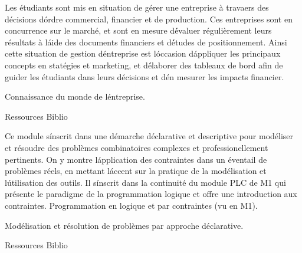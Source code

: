 \vfill

{
Les étudiants sont mis en situation de gérer une entreprise à travaers des décisions d\'ordre commercial, financier et de production. Ces entreprises sont en concurrence sur le marché, et sont en mesure d\'évaluer régulièrement leurs résultats à l\'aide des documents financiers et d\'études de positionnement. Ainsi cette situation de gestion d\'entreprise est l\'occasion d\'appliquer les principaux concepts en statégies et marketing, et d\'élaborer des tableaux de bord afin de guider les étudiants dans leurs décisions et d\'en mesurer les impacts financier. 
} 
{} 
{\begin{itemize}
\ObjItem Connaissance du monde de l\'entreprise.
\end{itemize} 
} 
{Ressources} 
{Biblio} 
 
\vfill

{
Ce module s\'inscrit dans une démarche déclarative et descriptive pour modéliser et résoudre des problèmes combinatoires complexes et professionellement pertinents.
On y montre l\'application des contraintes dans un éventail de problèmes réels, en mettant l\'accent sur la pratique de la modélisation et l\'utilisation des outils.
Il s\'inscrit dans la continuité du module PLC de M1 qui présente le paradigme de la programmation logique et offre une introduction aux contraintes. 
} 
{Programmation en logique et par contraintes (vu en M1).} 
{\begin{itemize}
\ObjItem Modélisation et résolution de problèmes par approche déclarative.
\end{itemize} 
} 
{Ressources} 
{Biblio} 
 
